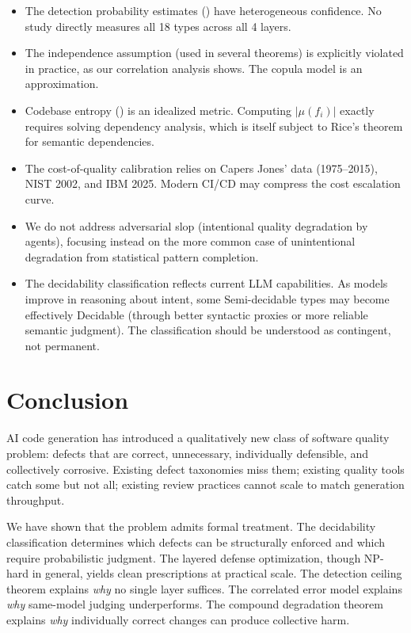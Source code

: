 \documentclass[11pt, a4paper, copyright]{googledeepmind}
\begin{document}
\begin{itemize}
\item The detection probability estimates () have heterogeneous confidence. No study directly measures all 18 types across all 4 layers.
\item The independence assumption (used in several theorems) is explicitly violated in practice, as our correlation analysis shows. The copula model is an approximation.
\item Codebase entropy () is an idealized metric. Computing $|\mu(f_i)|$ exactly requires solving dependency analysis, which is itself subject to Rice's theorem for semantic dependencies.
\item The cost-of-quality calibration relies on Capers Jones' data (1975--2015), NIST 2002, and IBM 2025. Modern CI/CD may compress the cost escalation curve.
\item We do not address adversarial slop (intentional quality degradation by agents), focusing instead on the more common case of unintentional degradation from statistical pattern completion.
\item The decidability classification reflects current LLM capabilities. As models improve in reasoning about intent, some Semi-decidable types may become effectively Decidable (through better syntactic proxies or more reliable semantic judgment). The classification should be understood as contingent, not permanent.
\end{itemize}


\section{Conclusion}
\label{sec:conclusion}

AI code generation has introduced a qualitatively new class of software quality problem: defects that are correct, unnecessary, individually defensible, and collectively corrosive. Existing defect taxonomies miss them; existing quality tools catch some but not all; existing review practices cannot scale to match generation throughput.

We have shown that the problem admits formal treatment. The decidability classification determines which defects can be structurally enforced and which require probabilistic judgment. The layered defense optimization, though NP-hard in general, yields clean prescriptions at practical scale. The detection ceiling theorem explains \emph{why} no single layer suffices. The correlated error model explains \emph{why} same-model judging underperforms. The compound degradation theorem explains \emph{why} individually correct changes can produce collective harm.
\end{document}
